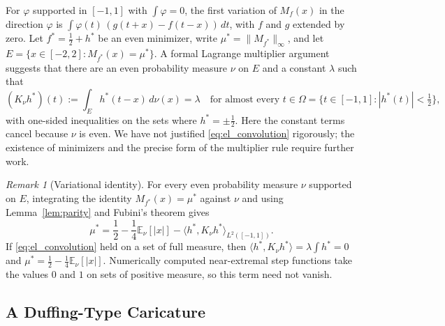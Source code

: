 \documentclass[11pt,a4paper]{article}
\theoremstyle{definition}
\theoremstyle{remark}
\newtheorem{remark}[theorem]{Remark}
\newcommand{\E}{\mathbb{E}}
\begin{document}
For $\varphi$ supported in $[-1, 1]$ with $\int \varphi = 0$, the first variation of $M_f(x)$ in the direction $\varphi$ is $\int \varphi(t) \, (g(t+x) - f(t-x)) \, dt$, with $f$ and $g$ extended by zero. Let $f^* = \frac{1}{2} + h^*$ be an even minimizer, write $\mu^* = \|M_{f^*}\|_\infty$, and let $E = \{x \in [-2, 2] : M_{f^*}(x) = \mu^*\}$. A formal Lagrange multiplier argument suggests that there are an even probability measure $\nu$ on $E$ and a constant $\lambda$ such that
\begin{equation}
\label{eq:el_convolution}
(K_\nu h^*)(t) := \int_E h^*(t - x) \, d\nu(x) = \lambda \quad \text{for almost every } t \in \Omega = \{t \in [-1, 1] : |h^*(t)| < \tfrac{1}{2}\},
\end{equation}
with one-sided inequalities on the sets where $h^* = \pm \frac{1}{2}$. Here the constant terms cancel because $\nu$ is even. We have not justified \eqref{eq:el_convolution} rigorously; the existence of minimizers and the precise form of the multiplier rule require further work.

\begin{remark}[Variational identity]
For every even probability measure $\nu$ supported on $E$, integrating the identity $M_{f^*}(x) = \mu^*$ against $\nu$ and using Lemma~\ref{lem:parity} and Fubini's theorem gives
\begin{equation}
\mu^* = \frac{1}{2} - \frac{1}{4} \E_{\nu}[|x|] - \langle h^*, K_{\nu} h^* \rangle_{L^2([-1, 1])}.
\end{equation}
If \eqref{eq:el_convolution} held on a set of full measure, then $\langle h^*, K_\nu h^* \rangle = \lambda \int h^* = 0$ and $\mu^* = \frac{1}{2} - \frac{1}{4}\E_\nu[|x|]$. Numerically computed near-extremal step functions take the values $0$ and $1$ on sets of positive measure, so this term need not vanish.
\end{remark}

\subsection{A Duffing-Type Caricature}
\end{document}
